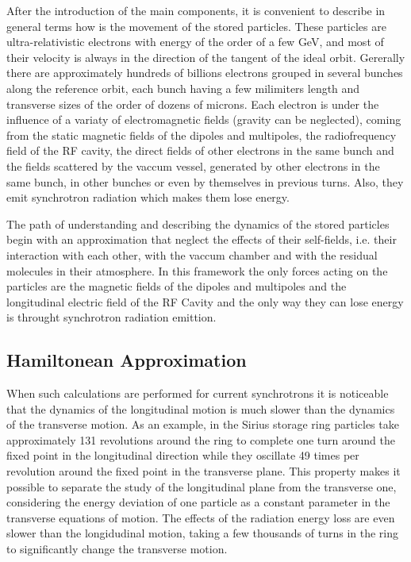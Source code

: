 \documentclass[
	12pt,				%
	openright,			%
	oneside,			%
	a4paper,		%
	chapter=TITLE,		%
	section=TITLE,		%
    brazil,				%
	english,			%
	sumario=tradicional,
	]{abntex2}
\begin{document}
  After the introduction of the main components, it is convenient to describe in general terms how is the movement of the stored particles. These particles are ultra-relativistic electrons with energy of the order of a few \si{GeV}, and most of their velocity is always in the direction of the tangent of the ideal orbit. Gererally there are approximately hundreds of billions electrons grouped in several bunches along the reference orbit, each bunch having a few milimiters length and transverse sizes of the order of dozens of microns. Each electron is under the influence of a variaty of electromagnetic fields (gravity can be neglected), coming from the static magnetic fields of the dipoles and multipoles, the radiofrequency field of the RF cavity, the direct fields of other electrons in the same bunch and the fields scattered by the vaccum vessel, generated by other electrons in the same bunch, in other bunches or even by themselves in previous turns. Also, they emit synchrotron radiation which makes them lose energy.

  The path of understanding and describing the dynamics of the stored particles begin with an approximation that neglect the effects of their self-fields, i.e. their interaction with each other, with the vaccum chamber and with the residual molecules in their atmosphere. In this framework the only forces acting on the particles are the magnetic fields of the dipoles and multipoles and the longitudinal electric field of the RF Cavity and the only way they can lose energy is throught synchrotron radiation emittion.

    \subsection{Hamiltonean Approximation}

    When such calculations are performed for current synchrotrons it is noticeable that the dynamics of the longitudinal motion is much slower than the dynamics of the transverse motion. As an example, in the Sirius storage ring particles take approximately 131 revolutions around the ring to complete one turn around the fixed point in the longitudinal direction while they oscillate 49 times per revolution around the fixed point in the transverse plane. This property makes it possible to separate the study of the longitudinal plane from the transverse one, considering the energy deviation of one particle as a constant parameter in the transverse equations of motion. The effects of the radiation energy loss are even slower than the longidudinal motion, taking a few thousands of turns in the ring to significantly change the transverse motion.
\end{document}
